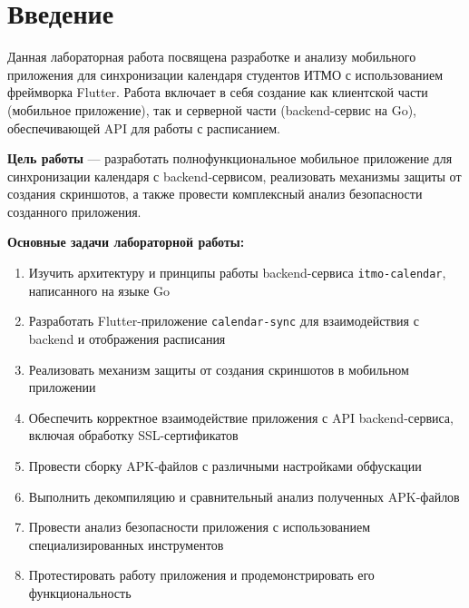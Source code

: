 \chapter*{Введение}

Данная лабораторная работа посвящена разработке и анализу мобильного приложения для синхронизации календаря студентов ИТМО с использованием фреймворка Flutter. Работа включает в себя создание как клиентской части (мобильное приложение), так и серверной части (backend-сервис на Go), обеспечивающей API для работы с расписанием.

\textbf{Цель работы} --- разработать полнофункциональное мобильное приложение для синхронизации календаря с backend-сервисом, реализовать механизмы защиты от создания скриншотов, а также провести комплексный анализ безопасности созданного приложения.

\textbf{Основные задачи лабораторной работы:}
\begin{enumerate}
    \item Изучить архитектуру и принципы работы backend-сервиса \texttt{itmo-calendar}, написанного на языке Go
    \item Разработать Flutter-приложение \texttt{calendar-sync} для взаимодействия с backend и отображения расписания
    \item Реализовать механизм защиты от создания скриншотов в мобильном приложении
    \item Обеспечить корректное взаимодействие приложения с API backend-сервиса, включая обработку SSL-сертификатов
    \item Провести сборку APK-файлов с различными настройками обфускации
    \item Выполнить декомпиляцию и сравнительный анализ полученных APK-файлов
    \item Провести анализ безопасности приложения с использованием специализированных инструментов
    \item Протестировать работу приложения и продемонстрировать его функциональность
\end{enumerate}

